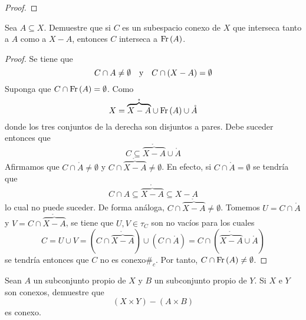 \documentclass[12pt]{report}
\theoremstyle{largebreak}
\newcommand\contradiction{\ensuremath{\#_c}}
\newcommand{\Int}[1]{\ensuremath{\mathring{#1}}}
\newcommand{\Fr}[1]{\ensuremath{\textup{Fr}\left(#1\right)}}
\begin{document}
    \begin{proof}
        
    \end{proof}

    \begin{excer}
        Sea $A\subseteq X$. Demuestre que si $C$ es un subespacio conexo de $X$ que interseca tanto a $A$ como a $X-A$, entonces $C$ interseca a $\Fr{A}$.
    \end{excer}

    \begin{proof}
        Se tiene que
        \begin{equation*}
            C\cap A\neq\emptyset\quad\textup{y}\quad C\cap(X-A)=\emptyset
        \end{equation*}
        Suponga que $C\cap\Fr{A}=\emptyset$. Como
        \begin{equation*}
            X=\Int{\overbrace{X-A}}\cup\Fr{A}\cup\Int{A}
        \end{equation*}
        donde los tres conjuntos de la derecha son disjuntos a pares. Debe suceder entonces que
        \begin{equation*}
            C\subseteq \Int{\overbrace{X-A}}\cup\Int{A}
        \end{equation*}
        Afirmamos que $C\cap\Int{A}\neq\emptyset$ y $C\cap\Int{\overbrace{X-A}}\neq\emptyset$. En efecto, si $C\cap\Int{A}=\emptyset$ se tendría que
        \begin{equation*}
            C\cap A\subseteq \Int{\overbrace{X-A}}\subseteq X-A
        \end{equation*}
        lo cual no puede suceder. De forma análoga, $C\cap\Int{\overbrace{X-A}}\neq\emptyset$. Tomemos $U=C\cap\Int{A}$ y $V=C\cap\Int{\overbrace{X-A}}$, se tiene que $U,V\in\tau_C$ son no vacíos para los cuales
        \begin{equation*}
            C=U\cup V=(C\cap\Int{\overbrace{X-A}})\cup(C\cap\Int{A})=C\cap\left(\Int{\overbrace{X-A}}\cup\Int{A}\right)
        \end{equation*}
        se tendría entonces que $C$ no es conexo\contradiction. Por tanto, $C\cap\Fr{A}\neq\emptyset$.
    \end{proof}

    \begin{excer}
        Sean $A$ un subconjunto propio de $X$ y $B$ un subconjunto propio de $Y$. Si $X$ e $Y$ son conexos, demuestre que
        \begin{equation*}
            (X\times Y)-(A\times B)
        \end{equation*}
        es conexo.
    \end{excer}
\end{document}
